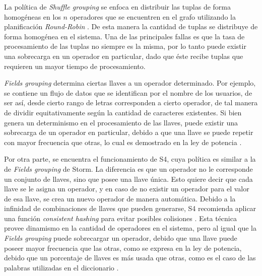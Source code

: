 La pol\'itica de \textit{Shuffle grouping} se enfoca en distribuir las tuplas de forma homog\'eneas en los $n$ operadores que se encuentren en el grafo utilizando la planificaci\'on \textit{Round-Robin} \citep{bookScheduling}. De esta manera la cantidad de tuplas se distribuye de forma homog\'enea en el sistema. Una de las principales fallas es que la tasa de procesamiento de las tuplas no siempre es la misma, por lo tanto puede existir una sobrecarga en un operador en particular, dado que \'este recibe tuplas que requieren un mayor tiempo de procesamiento.

\textit{Fields grouping} determina ciertas llaves a un operador determinado. Por ejemplo, se contiene un flujo de datos que se identifican por el nombre de los usuarios, de ser as\'i, desde cierto rango de letras corresponden a cierto operador, de tal manera de dividir equitativamente seg\'un la cantidad de caracteres existentes. Si bien genera un determinismo en el procesamiento de las llaves, puede existir una sobrecarga de un operador en particular, debido a que una llave se puede repetir con mayor frecuencia que otras, lo cual es demostrado en la ley de potencia \citep{rushton2010handbook}.


Por otra parte, se encuentra el funcionamiento de S4, cuya pol\'itica es similar a la de \textit{Fields grouping} de Storm. La diferencia es que un operador no le corresponde un conjunto de llaves, sino que posee una llave \'unica. Esto quiere decir que cada llave se le asigna un operador, y en caso de no existir un operador para el valor de esa llave, se crea un nuevo operador de manera autom\'atica. Debido a la infinidad de combinaciones de llaves que pueden generarse, S4 recomienda aplicar una funci\'on \textit{consistent hashing} para evitar posibles colisiones \citep{X11cp}. Esta t\'ecnica provee dinamismo en la cantidad de operadores en el sistema, pero al igual que la \textit{Fields grouping} puede sobrecargar un operador, debido que una llave puede poseer mayor frecuencia que las otras, como se expresa en la ley de potencia, debido que un porcentaje de llaves es m\'as usada que otras, como es el caso de las palabras utilizadas en el diccionario \citep{rushton2010handbook}.

